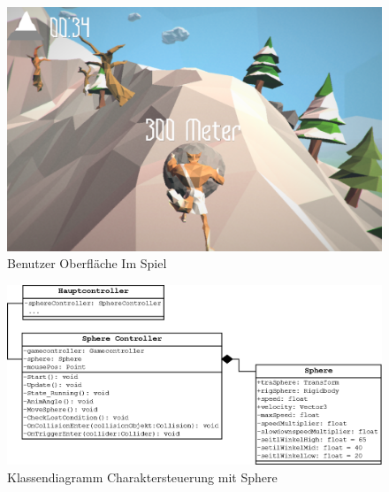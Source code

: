 \begin{figure}[H]
\centering
\caption{Benutzer Oberfläche Im Spiel}
\label{Abb:UIIngame}
\includegraphics[scale=5.25]{Bilder/SisyfoxUI.png}
\end{figure}

\begin{figure}[H]
\centering
\caption{Klassendiagramm Charaktersteuerung mit Sphere}
\label{Abb:KlassendiaMain}
\includegraphics[width=\textwidth, height=0.6\textwidth]{Bilder/Diagramme/KlassendiagrammMain.png}
\end{figure}


